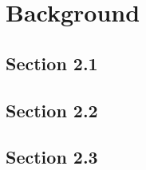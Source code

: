 

\chapter{Background}\label{chap:2}

\section{Section 2.1}\label{section2.1}

\lipsum[1-2] %

\section{Section 2.2}\label{section2.2}

\lipsum[1-2]

\section{Section 2.3}\label{section2.3}

\lipsum[1-2]
